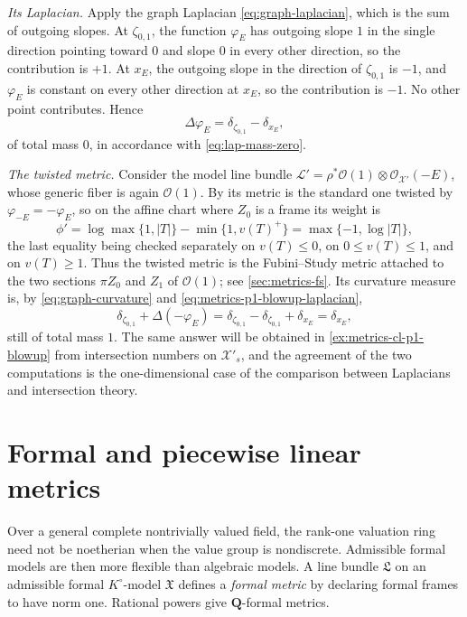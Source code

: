 \begin{example}
\emph{Its Laplacian.} Apply the graph Laplacian
\eqref{eq:graph-laplacian}, which is the sum of outgoing slopes. At
$\zeta_{0,1}$, the function $\varphi_E$ has outgoing slope $1$ in the
single direction pointing toward $0$ and slope $0$ in every other
direction, so the contribution is $+1$. At $x_E$, the outgoing slope in
the direction of $\zeta_{0,1}$ is $-1$, and $\varphi_E$ is constant on
every other direction at $x_E$, so the contribution is $-1$. No other
point contributes. Hence
\begin{equation}
\label{eq:metrics-p1-blowup-laplacian}
 \Delta\varphi_E=\delta_{\zeta_{0,1}}-\delta_{x_E},
\end{equation}
of total mass $0$, in accordance with \eqref{eq:lap-mass-zero}.

\emph{The twisted metric.} Consider the model line bundle
$\mathcal L'=\rho^*\mathcal O(1)\otimes\mathcal O_{\mathcal X'}(-E)$, whose
generic fiber is again $\mathcal O(1)$. By
 its metric is the standard one twisted
by $\varphi_{-E}=-\varphi_E$, so on the affine chart where $Z_0$ is a
frame its weight is
\[
 \phi'=\log\max\{1,|T|\}-\min\{1,v(T)^+\}
 =\max\{-1,\log|T|\},
\]
the last equality being checked separately on $v(T)\le0$, on
$0\le v(T)\le1$, and on $v(T)\ge1$. Thus the twisted metric is the
Fubini--Study metric attached to the two sections $\pi Z_0$ and $Z_1$
of $\mathcal O(1)$; see \cref{sec:metrics-fs}. Its curvature measure is,
by \eqref{eq:graph-curvature} and
\eqref{eq:metrics-p1-blowup-laplacian},
\[
 \delta_{\zeta_{0,1}}+\Delta(-\varphi_E)
 =\delta_{\zeta_{0,1}}-\delta_{\zeta_{0,1}}+\delta_{x_E}
 =\delta_{x_E},
\]
still of total mass $1$. The same answer will be obtained in
\cref{ex:metrics-cl-p1-blowup} from intersection numbers on
$\mathcal X'_s$, and the agreement of the two computations is the
one-dimensional case of the comparison between Laplacians and intersection
theory.
\end{example}

\section{Formal and piecewise linear metrics}
\label{sec:metrics-formal-pl}

Over a general complete nontrivially valued field, the rank-one valuation
ring need not be noetherian when the value group is nondiscrete. Admissible
formal models are then more flexible than
algebraic models. A line bundle $\mathfrak L$ on an admissible formal
$K^\circ$-model $\mathfrak X$ defines a \emph{formal metric} by declaring
formal frames to have norm one. Rational powers give
$\mathbf Q$-formal metrics.

